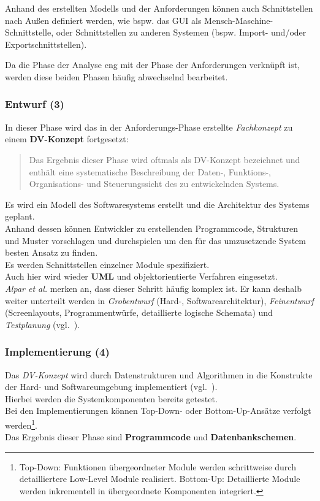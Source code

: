 \noindent
Anhand des erstellten Modells und der Anforderungen können auch Schnittstellen nach Außen definiert werden, wie bspw. das GUI als Mensch-Maschine-Schnittstelle, oder Schnittstellen zu anderen Systemen (bspw. Import- und/oder Exportschnittstellen).

\noindent
Da die Phase der Analyse eng mit der Phase der Anforderungen verknüpft ist, werden diese beiden Phasen häufig abwechselnd bearbeitet.


\subsubsection{Entwurf (3)}
In dieser Phase wird das in der Anforderungs-Phase erstellte \textit{Fachkonzept} zu einem \textbf{DV-Konzept} fortgesetzt:

\blockquote[{\cite[319]{AABG14n}}]{
    Das Ergebnis dieser Phase wird oftmals als DV-Konzept bezeichnet und enthält eine systematische Beschreibung
    der Daten-, Funktions-, Organisations- und Steuerungssicht des zu entwickelnden Systems.
}

\noindent
Es wird ein Modell des Softwaresystems erstellt und die Architektur des Systems geplant.\\
Anhand dessen können Entwickler zu erstellenden Programmcode, Strukturen und Muster vorschlagen und durchspielen um den für das umzusetzende System besten Ansatz zu finden.\\
Es werden Schnittstellen einzelner Module spezifiziert.\\
Auch hier wird wieder \textbf{UML} und objektorientierte Verfahren eingesetzt.\\

\noindent
\textit{Alpar et al.} merken an, dass dieser Schritt häufig komplex ist.
Er kann deshalb weiter unterteilt werden in \textit{Grobentwurf} (Hard-, Softwarearchitektur), \textit{Feinentwurf} (Screenlayouts, Programmentwürfe, detaillierte logische Schemata) und \textit{Testplanung} (vgl.~\cite[319]{AABG14n}).

\subsubsection{Implementierung (4)}
Das \textit{DV-Konzept} wird durch Datenstrukturen und Algorithmen in die Konstrukte der Hard- und Softwareumgebung implementiert (vgl.~\cite[319]{AABG14n}).\\
Hierbei werden die Systemkomponenten bereits getestet.\\
Bei den Implementierungen können Top-Down- oder Bottom-Up-Ansätze verfolgt werden\footnote{
    Top-Down: Funktionen übergeordneter Module werden schrittweise durch detailliertere Low-Level Module realisiert. Bottom-Up: Detaillierte Module werden inkrementell in übergeordnete Komponenten integriert.
}.\\
Das Ergebnis dieser Phase sind \textbf{Programmcode} und \textbf{Datenbankschemen}.

